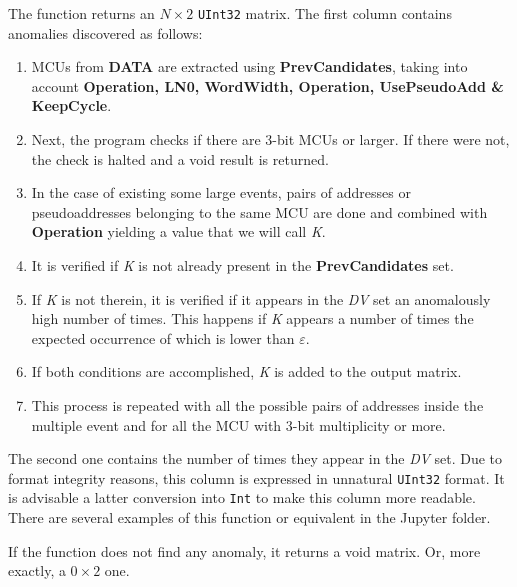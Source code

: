 \begin{itemize}
\begin{itemize}
 	\end{itemize}
 	
 	The function returns an \(N\times 2\) \texttt{UInt32} matrix. The first column contains anomalies discovered as follows:
 	
 	\begin{enumerate}
 		\item MCUs from \textbf{DATA} are extracted using \textbf{PrevCandidates}, taking into account \textbf{Operation, LN0, WordWidth, Operation, UsePseudoAdd \& KeepCycle}.
 		\item Next, the program checks if there are 3-bit MCUs or larger. If there were not, the check is halted and a void result is returned.
 		\item In the case of existing some large events, pairs of addresses or pseudoaddresses belonging to the same MCU are done and combined with \textbf{Operation} yielding a value that we will call  \textit{K}.
 		\item It is verified if \textit{K} is not already present in the \textbf{PrevCandidates} set.
 		\item If \textit{K} is not therein, it is verified if it appears in the \textit{DV} set an anomalously high number of times. This happens if \textit{K} appears a number of times the expected occurrence of which is lower than \textbf{\(\varepsilon\)}.
 		\item If both conditions are accomplished, \textit{K} is added to the output matrix.
 		\item This process is repeated with all the possible pairs of addresses inside the multiple event and for all the MCU with 3-bit multiplicity or more.
 	\end{enumerate}
 	
 	The second one contains the number of times they appear in the \textit{DV} set. Due to format integrity reasons, this column is expressed in unnatural \texttt{UInt32} format. It is advisable a latter conversion into \texttt{Int} to make this column more readable. There are several examples of this function or equivalent in the Jupyter folder.
 	
 	If the function does not find any anomaly, it returns a void matrix.  Or, more exactly, a \(0\times 2\) one.
 	
 \end{itemize}
